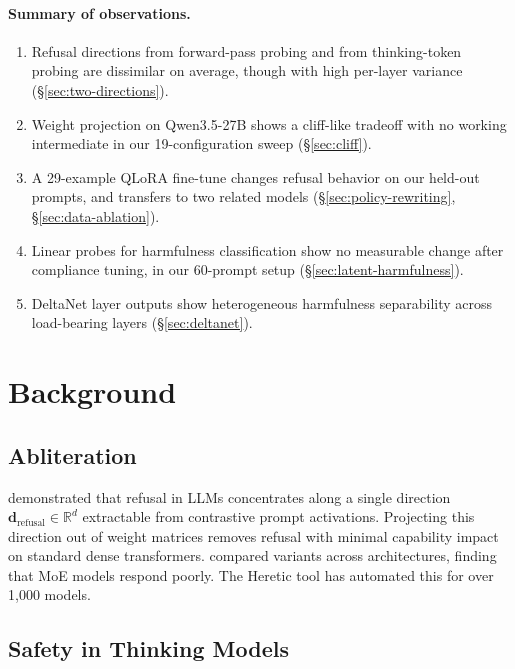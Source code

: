 \documentclass{article}
\begin{document}
\paragraph{Summary of observations.}
\begin{enumerate}
    \item Refusal directions from forward-pass probing and from thinking-token probing are dissimilar on average, though with high per-layer variance (\S\ref{sec:two-directions}).
    \item Weight projection on Qwen3.5-27B shows a cliff-like tradeoff with no working intermediate in our 19-configuration sweep (\S\ref{sec:cliff}).
    \item A 29-example QLoRA fine-tune changes refusal behavior on our held-out prompts, and transfers to two related models (\S\ref{sec:policy-rewriting}, \S\ref{sec:data-ablation}).
    \item Linear probes for harmfulness classification show no measurable change after compliance tuning, in our 60-prompt setup (\S\ref{sec:latent-harmfulness}).
    \item DeltaNet layer outputs show heterogeneous harmfulness separability across load-bearing layers (\S\ref{sec:deltanet}).
\end{enumerate}

\section{Background}
\label{sec:background}

\subsection{Abliteration}

\citet{arditi2024refusal} demonstrated that refusal in LLMs concentrates along a single direction $\mathbf{d}_{\text{refusal}} \in \mathbb{R}^{d}$ extractable from contrastive prompt activations. Projecting this direction out of weight matrices removes refusal with minimal capability impact on standard dense transformers. \citet{abliteration-comparison} compared variants across architectures, finding that MoE models respond poorly. The Heretic tool \citep{heretic} has automated this for over 1{,}000 models.

\subsection{Safety in Thinking Models}
\end{document}
